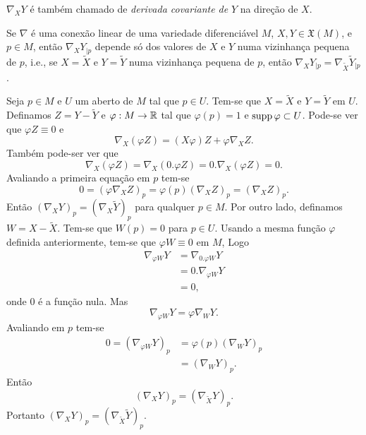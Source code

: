 \begin{observacao}
	$\nabla_X Y$ é também chamado de \emph{derivada covariante de} $Y$ na direção de $X$.
\end{observacao}

\begin{lema}\label{boa_definicao_conexao_1}
	Se $\nabla$ é uma conexão linear de uma variedade diferenciável $M$, $X,Y \in \mathfrak{X}(M)$, e $p \in M$, então $\nabla_X Y_{|p}$ depende só dos valores de $X$ e $Y$ numa vizinhança pequena de $p$, i.e., se $X = \tilde{X}$ e $Y = \tilde{Y}$ numa vizinhança pequena de $p$, então $\nabla_X Y_{|p} = \nabla_{\tilde{X}} \tilde{Y}_{|p}$.
\end{lema}

\begin{demonstracao}
	Seja $p \in M$ e $U$ um aberto de $M$ tal que $p \in U$. Tem-se que $X = \tilde{X}$ e $Y = \tilde{Y}$ em $U$. Definamos $Z = Y - \tilde{Y}$ e $\varphi: M \rightarrow \mathbb{R}$ tal que $\varphi(p)=1$ e $\operatorname{supp} \varphi \subset U$. Pode-se ver que $\varphi Z \equiv 0$ e
	\begin{equation*}
		\nabla_X (\varphi Z) = (X \varphi) Z + \varphi \nabla_X Z.
	\end{equation*}
	Também pode-ser ver que
	\begin{equation*}
		\nabla_X (\varphi Z)  = \nabla_X (0 . \varphi Z) = 0 . \nabla_X (\varphi Z) = 0.
	\end{equation*}
	Avaliando a primeira equação em $p$ tem-se
	\begin{equation*}
		0 = (\varphi \nabla_X Z)_p = \varphi(p) (\nabla_X Z)_p = (\nabla_X Z)_p.
	\end{equation*}
	Então $(\nabla_X Y)_p = (\nabla_X \tilde{Y})_p$ para qualquer $p \in M$.
	Por outro lado, definamos $W = X - \tilde{X}$. Tem-se que $W(p) = 0$ para $p \in U$. Usando a mesma função $\varphi$ definida anteriormente, tem-se que $\varphi W \equiv 0$ em $M$, Logo
	\begin{align*}
		\nabla_{\varphi W} Y &= \nabla_{0 . \varphi W} Y\\
		&= 0 . \nabla_{\varphi W} Y\\
		&= 0,
	\end{align*}
	onde $0$ é a função nula. Mas
	\begin{equation*}
		\nabla_{\varphi W} Y = \varphi \nabla_W Y.
	\end{equation*}
	Avaliando em $p$ tem-se
	\begin{align*}
		0 = (\nabla_{\varphi W} Y)_p &= \varphi(p) (\nabla_W Y)_p\\
		&= (\nabla_W Y)_p.
	\end{align*}
	Então
	\begin{equation*}
		(\nabla_X Y)_p = (\nabla_{\tilde{X}} Y)_p.
	\end{equation*}
	Portanto $(\nabla_X Y)_p = (\nabla_{\tilde{X}} \tilde{Y})_p$.
\end{demonstracao}

